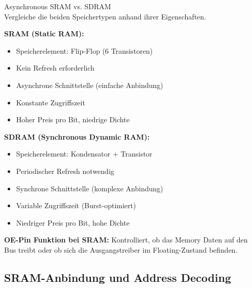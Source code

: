 \begin{example2}{Asynchronous SRAM vs. SDRAM}\\
    Vergleiche die beiden Speichertypen anhand ihrer Eigenschaften.
    
    \tcblower
    
    \textbf{SRAM (Static RAM):}
    \begin{itemize}
        \item Speicherelement: Flip-Flop (6 Transistoren)
        \item Kein Refresh erforderlich
        \item Asynchrone Schnittstelle (einfache Anbindung)
        \item Konstante Zugriffszeit
        \item Hoher Preis pro Bit, niedrige Dichte
    \end{itemize}
    
    \textbf{SDRAM (Synchronous Dynamic RAM):}
    \begin{itemize}
        \item Speicherelement: Kondensator + Transistor
        \item Periodischer Refresh notwendig
        \item Synchrone Schnittstelle (komplexe Anbindung)
        \item Variable Zugriffszeit (Burst-optimiert)
        \item Niedriger Preis pro Bit, hohe Dichte
    \end{itemize}
    
    \textbf{OE-Pin Funktion bei SRAM:}
    Kontrolliert, ob das Memory Daten auf den Bus treibt oder ob sich die Ausgangstreiber im Floating-Zustand befinden.
\end{example2}

\subsection{SRAM-Anbindung und Address Decoding}

